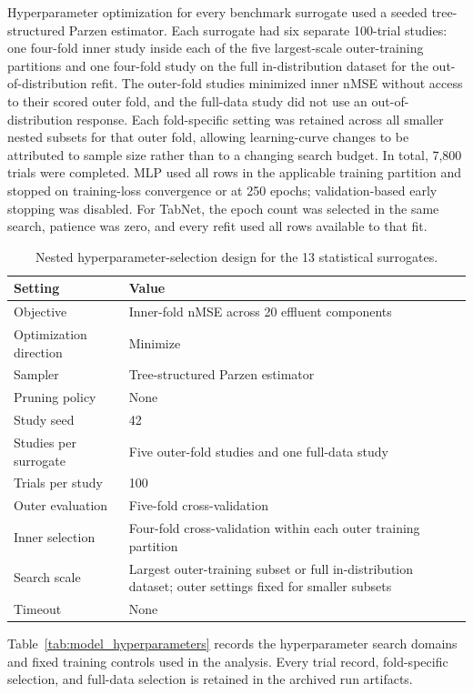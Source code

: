 \documentclass[a4paper,fleqn]{cas-sc}
\begin{document}
Hyperparameter optimization for every benchmark surrogate used a seeded tree-structured Parzen estimator. Each surrogate had six separate 100-trial studies: one four-fold inner study inside each of the five largest-scale outer-training partitions and one four-fold study on the full in-distribution dataset for the out-of-distribution refit. The outer-fold studies minimized inner nMSE without access to their scored outer fold, and the full-data study did not use an out-of-distribution response. Each fold-specific setting was retained across all smaller nested subsets for that outer fold, allowing learning-curve changes to be attributed to sample size rather than to a changing search budget. In total, 7,800 trials were completed. MLP used all rows in the applicable training partition and stopped on training-loss convergence or at 250 epochs; validation-based early stopping was disabled. For TabNet, the epoch count was selected in the same search, patience was zero, and every refit used all rows available to that fit.

\begin{table}[htbp]
\centering
\caption{Nested hyperparameter-selection design for the 13 statistical surrogates.}
\label{tab:optuna_design}
\scriptsize
\begin{tabular}{ll}
\hline
Setting & Value \\
\hline
Objective & Inner-fold nMSE across 20 effluent components \\
Optimization direction & Minimize \\
Sampler & Tree-structured Parzen estimator \\
Pruning policy & None \\
Study seed & 42 \\
Studies per surrogate & Five outer-fold studies and one full-data study \\
Trials per study & 100 \\
Outer evaluation & Five-fold cross-validation \\
Inner selection & Four-fold cross-validation within each outer training partition \\
Search scale & Largest outer-training subset or full in-distribution dataset; outer settings fixed for smaller subsets \\
Timeout & None \\
\hline
\end{tabular}
\end{table}

Table~\ref{tab:model_hyperparameters} records the hyperparameter search domains and fixed training controls used in the analysis. Every trial record, fold-specific selection, and full-data selection is retained in the archived run artifacts.
\end{document}
